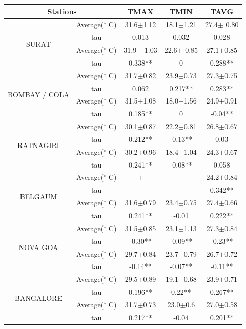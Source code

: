 \documentclass{article}
\begin{document}
\begin{tabular}{|c|c|c|c|c|}\hline 
\multicolumn{2}{|c|}{Stations} & TMAX & TMIN & TAVG \\ \hline 
\multirow{4}{*}{SURAT}&Average($^\circ$ C)&31.6$\pm$1.12&18.1$\pm$1.21&27.4$\pm$ 0.80\\
 &tau&0.013&0.032&0.028\\ \hline
\multirow{4}{*}{BOMBAY/SANTACRUZ}&Average($^\circ$ C)&31.9$\pm$ 1.03&22.6$\pm$ 0.85&27.1$\pm$0.85\\
 &tau&0.338**&0&0.288**\\ \hline
\multirow{4}{*}{BOMBAY / COLA}&Average($^\circ$ C)&31.7$\pm$0.82&23.9$\pm$0.73&27.3$\pm$0.75\\ 
&tau&0.062&0.217**&0.283**\\ \hline
\multirow{4}{*}{PUNE}&Average($^\circ$ C)&31.5$\pm$1.08&18.0$\pm$1.56&24.9$\pm$0.91\\ 
&tau&0.185**&0&-0.04**\\ \hline
\multirow{4}{*}{RATNAGIRI}&Average($^\circ$ C)&30.1$\pm$0.87&22.2$\pm$0.81&26.8$\pm$0.67\\ 
&tau&0.212**&-0.13**&0.03\\ \hline
\multirow{4}{*}{BELGAUM/SAMBRA}&Average($^\circ$ C)&30.2$\pm$0.96&18.4$\pm$1.04&24.3$\pm$0.67\\
 &tau&0.241**&-0.08**&0.058\\ \hline
\multirow{4}{*}{BELGAUM}&Average($^\circ$ C)&$\pm$&$\pm$&24.2$\pm$0.84\\ 
&tau&&&0.342**\\ \hline
\multirow{4}{*}{GOA/PANJIM}&Average($^\circ$ C)&31.6$\pm$0.79&23.4$\pm$0.75&27.4$\pm$0.66\\ 
&tau&0.241**&-0.01&0.222**\\ \hline
\multirow{4}{*}{NOVA GOA}&Average($^\circ$ C)&31.5$\pm$0.85&23.1$\pm$1.13&27.3$\pm$0.84\\ 
&tau&-0.30**&-0.09**&-0.23**\\ \hline
\multirow{4}{*}{MARMAGAO}&Average($^\circ$ C)&29.7$\pm$0.84&23.7$\pm$0.79&26.7$\pm$0.72\\ 
&tau&-0.14**&-0.07**&-0.11**\\ \hline
\multirow{4}{*}{BANGALORE}&Average($^\circ$ C)&29.5$\pm$0.89&19.1$\pm$0.68&23.9$\pm$0.71\\ 
&tau&0.196**& 0.22**&0.267**\\ \hline
\multirow{4}{*}{MANGALORE/BAJPE}&Average($^\circ$ C)&31.7$\pm$0.73&23.0$\pm$0.6&27.0$\pm$0.58\\ 
&tau&0.217**&-0.04&0.201**\\ \hline

\end{tabular}
\end{document}
